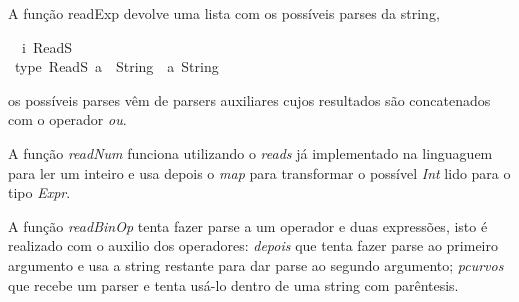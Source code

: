 \documentclass[a4paper]{article}
\begin{document}
A função readExp devolve uma lista com os possíveis parses
da string,
\begin{tabbing}\ttfamily
~~i~ReadS\\
\ttfamily ~type~ReadS~a~~String~~a~String
\end{tabbing}
os possíveis parses vêm de parsers auxiliares cujos resultados
são concatenados com o operador \textit{ou}.

A função \textit{readNum} funciona utilizando o \textit{reads} já
implementado na linguaguem para ler um inteiro e usa depois
o \textit{map} para transformar o possível \textit{Int} lido
para o tipo \textit{Expr}.

A função \textit{readBinOp} tenta fazer parse a um operador
e duas expressões, isto é realizado com o auxilio dos operadores:
\textit{depois} que tenta fazer parse ao primeiro argumento
e usa a string restante para dar parse ao segundo argumento;
\textit{pcurvos} que recebe um parser e tenta usá-lo dentro
de uma string com parêntesis.
\end{document}
